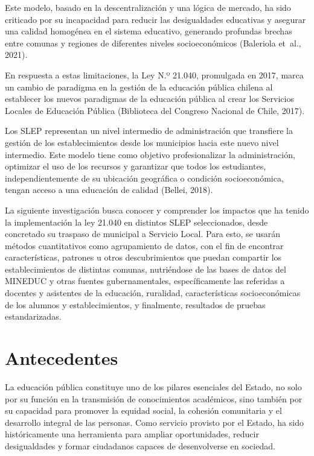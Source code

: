 \documentclass[
  12pt,
  letterpaper,
]{article}
\begin{document}
Este modelo, basado en la descentralización y una lógica de mercado, ha sido criticado por su incapacidad para reducir las desigualdades educativas y asegurar una calidad homogénea en el sistema educativo, generando profundas brechas entre comunas y regiones de diferentes niveles socioeconómicos (Baleriola et~al., 2021).

En respuesta a estas limitaciones, la Ley N.º 21.040, promulgada en 2017, marca un cambio de paradigma en la gestión de la educación pública chilena al establecer los nuevos paradigmas de la educación pública al crear los Servicios Locales de Educación Pública (Biblioteca del Congreso Nacional de Chile, 2017).

Los SLEP representan un nivel intermedio de administración que transfiere la gestión de los establecimientos desde los municipios hacia este nuevo nivel intermedio.
Este modelo tiene como objetivo profesionalizar la administración, optimizar el uso de los recursos y garantizar que todos los estudiantes, independientemente de su ubicación geográfica o condición socioeconómica, tengan acceso a una educación de calidad (Bellei, 2018).

La siguiente investigación busca conocer y comprender los impactos que ha tenido la implementación la ley 21.040 en distintos SLEP seleccionados, desde concretado su traspaso de municipal a Servicio Local.
Para esto, se usarán métodos cuantitativos como agrupamiento de datos, con el fin de encontrar características, patrones u otros descubrimientos que puedan compartir los establecimientos de distintas comunas, nutriéndose de las bases de datos del MINEDUC y otras fuentes gubernamentales, específicamente las referidas a docentes y asistentes de la educación, ruralidad, características socioeconómicas de los alumnos y establecimientos, y finalmente, resultados de pruebas estandarizadas.

\newpage

\section{Antecedentes}\label{antecedentes}

La educación pública constituye uno de los pilares esenciales del Estado, no solo por su función en la transmisión de conocimientos académicos, sino también por su capacidad para promover la equidad social, la cohesión comunitaria y el desarrollo integral de las personas.
Como servicio provisto por el Estado, ha sido históricamente una herramienta para ampliar oportunidades, reducir desigualdades y formar ciudadanos capaces de desenvolverse en sociedad.
\end{document}
